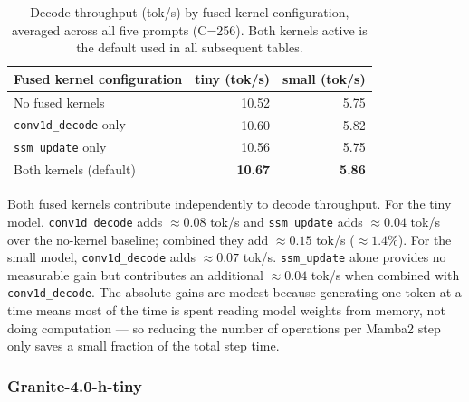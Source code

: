 \begin{table}[h]
\caption{Decode throughput (tok/s) by fused kernel configuration, averaged across all five prompts (C=256). Both kernels active is the default used in all subsequent tables.}
\label{tab:kernel-ablation}
\begin{tabular}{lrr}
\toprule
Fused kernel configuration & tiny (tok/s) & small (tok/s) \\
\midrule
No fused kernels              & 10.52 & 5.75 \\
\texttt{conv1d\_decode} only  & 10.60 & 5.82 \\
\texttt{ssm\_update} only     & 10.56 & 5.75 \\
Both kernels (default)        & \textbf{10.67} & \textbf{5.86} \\
\bottomrule
\end{tabular}
\end{table}

Both fused kernels contribute independently to decode throughput. For the tiny model, \texttt{conv1d\_decode} adds ${\approx}0.08$ tok/s and \texttt{ssm\_update} adds ${\approx}0.04$ tok/s over the no-kernel baseline; combined they add ${\approx}0.15$ tok/s (${\approx}1.4\%$). For the small model, \texttt{conv1d\_decode} adds ${\approx}0.07$ tok/s. \texttt{ssm\_update} alone provides no measurable gain but contributes an additional ${\approx}0.04$ tok/s when combined with \texttt{conv1d\_decode}. The absolute gains are modest because generating one token at a time means most of the time is spent reading model weights from memory, not doing computation — so reducing the number of operations per Mamba2 step only saves a small fraction of the total step time.

\subsubsection{Granite-4.0-h-tiny}

\begin{table}[h]
\caption{Decode throughput (tok/s), tiny model. Higher is better. $^*$Token counts for TT/CPU tokenizer; A100 tokenizer produces 98 and 181 tokens for the same prompts.}
\label{tab:tiny-decode}
\end{table}

